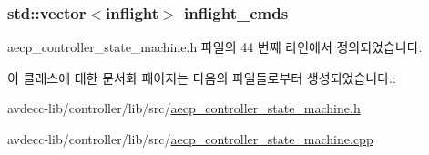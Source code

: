 \subsubsection[{\texorpdfstring{inflight\+\_\+cmds}{inflight_cmds}}]{\setlength{\rightskip}{0pt plus 5cm}std\+::vector$<${\bf inflight}$>$ inflight\+\_\+cmds\hspace{0.3cm}{\ttfamily [private]}}\hypertarget{classavdecc__lib_1_1aecp__controller__state__machine_a0475b054c1890c88809394d9cef2a4c0}{}\label{classavdecc__lib_1_1aecp__controller__state__machine_a0475b054c1890c88809394d9cef2a4c0}


aecp\+\_\+controller\+\_\+state\+\_\+machine.\+h 파일의 44 번째 라인에서 정의되었습니다.



이 클래스에 대한 문서화 페이지는 다음의 파일들로부터 생성되었습니다.\+:\begin{DoxyCompactItemize}
\item 
avdecc-\/lib/controller/lib/src/\hyperlink{aecp__controller__state__machine_8h}{aecp\+\_\+controller\+\_\+state\+\_\+machine.\+h}\item 
avdecc-\/lib/controller/lib/src/\hyperlink{aecp__controller__state__machine_8cpp}{aecp\+\_\+controller\+\_\+state\+\_\+machine.\+cpp}\end{DoxyCompactItemize}
